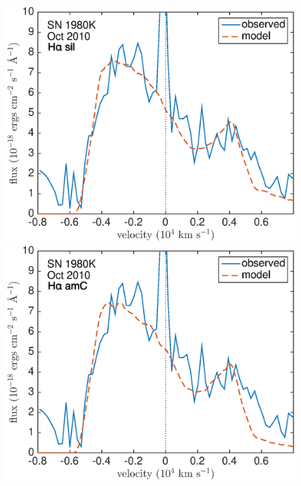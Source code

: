 {\begin{landscape}
\end{landscape}
\begin{figure}[!t]
\centering
\includegraphics[scale=0.4,clip=true, trim=20 0 40 20]{chapters/chapter6/figs/80K/clumped/Ha}
\includegraphics[scale=0.4,clip=true, trim=20 0 40 20]{chapters/chapter6/figs/80K/clumped/Ha_amC}


\end{figure}}
